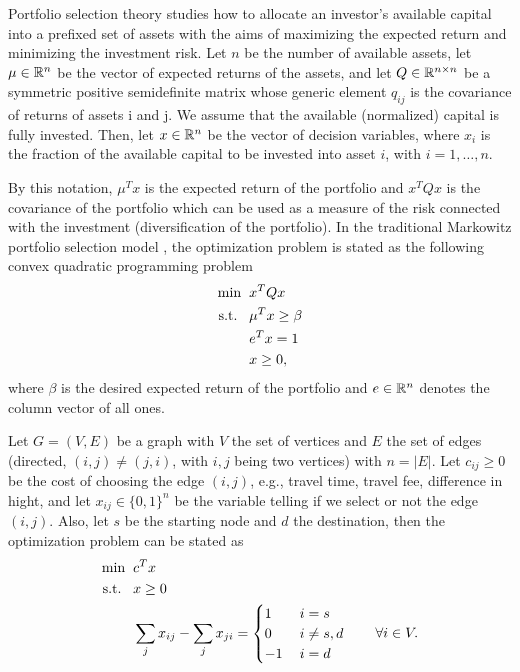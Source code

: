 \documentclass[10pt,a4paper]{article}
\begin{document}
\begin{example} Portfolio selection theory studies how to allocate an investor’s available capital into a prefixed set of assets with the aims of maximizing the expected return and minimizing the investment risk. Let $n$ be the number of available assets, let $\mu\in \mathbb{R}^n$ be the vector of expected returns of the assets, and let $Q \in \mathbb{R}^{n\times n}$ be a symmetric positive semidefinite matrix whose generic element $q_{ij}$ is the covariance of returns of assets i and j. We assume that the available (normalized) capital is fully invested. Then, let $x \in \mathbb{R}^n$ be the vector of decision variables, where $x_i$ is the fraction of the available capital to be invested into asset $i$, with $i = 1, \dots, n$. 
\par By this notation, $\mu^T x$ is the expected return of the portfolio and $x^TQx$ is the covariance of the portfolio which
can be used as a measure of the risk connected with the investment (diversification of the portfolio). 
In the traditional Markowitz portfolio selection model \cite{markowits52a}, the optimization problem is stated as the
following convex quadratic programming problem
\begin{equation*}
	\begin{split}
		\min \;\; &x^TQx\\
		\text{s.t.} \;\;\;& \mu^Tx\geq \beta \\
		& e^Tx =1\\
		& x\geq 0,
	\end{split}
\end{equation*}
where $\beta$ is the desired expected return of the portfolio and $e\in \mathbb{R}^n$ denotes the column vector of all ones.
\end{example}
\begin{example} Let $G=(V,E)$ be a graph with $V$ the set of vertices and $E$ the set of edges (directed, $(i,j)\neq(j,i)$, with $i,j$ being two vertices) with $n=|E|$. Let $c_{ij}\geq0$ be the cost of choosing the edge $(i,j)$, e.g., travel time, travel fee, difference in hight, and let $x_{ij}\in \{0,1\}^{n}$ be the variable telling if we select or not the edge $(i,j)$. Also, let $s$ be the starting node and $d$ the destination, then the optimization problem can be stated as
\begin{equation*}
	\begin{split}
		\min \;\; &c^Tx\\
		\text{s.t.} \;\;\;& x\geq 0\\
		& \sum_{j} x_{ij} - \sum_{j} x_{ji} = \begin{cases}1 \quad & i=s\\
			0 & i\neq s,d\\
			-1 & i=d
		\end{cases} \qquad \forall i \in V.
	\end{split}
\end{equation*}
\end{example}
\end{document}
